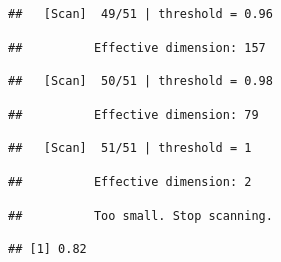 \documentclass[
]{book}
\newenvironment{Shaded}{\begin{snugshade}}{\end{snugshade}}
\newcommand{\CommentTok}[1]{\textcolor[rgb]{0.56,0.35,0.01}{\textit{#1}}}
\newcommand{\NormalTok}[1]{#1}
\newcommand{\SpecialCharTok}[1]{\textcolor[rgb]{0.81,0.36,0.00}{\textbf{#1}}}
\begin{document}
\begin{verbatim}
##   [Scan]  49/51 | threshold = 0.96
\end{verbatim}

\begin{verbatim}
##          Effective dimension: 157
\end{verbatim}

\begin{verbatim}
##   [Scan]  50/51 | threshold = 0.98
\end{verbatim}

\begin{verbatim}
##          Effective dimension: 79
\end{verbatim}

\begin{verbatim}
##   [Scan]  51/51 | threshold = 1
\end{verbatim}

\begin{verbatim}
##          Effective dimension: 2
\end{verbatim}

\begin{verbatim}
##          Too small. Stop scanning.
\end{verbatim}

\begin{Shaded}
\end{Shaded}

\begin{verbatim}
## [1] 0.82
\end{verbatim}
\end{document}
